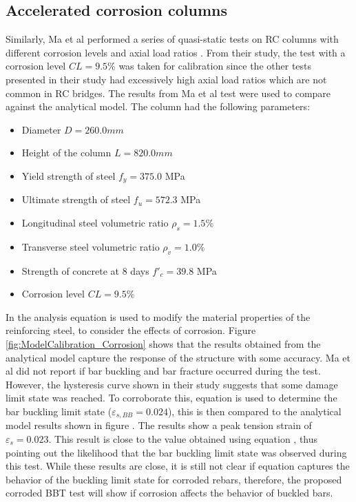 \subsection{Accelerated corrosion columns}
Similarly, Ma et al performed a series of quasi-static tests on RC columns with different corrosion levels and axial load ratios \cite{Ma2012}. From their study, the test with a corrosion level $CL=9.5\%$ was taken for calibration since the other tests presented in their study had excessively high axial load ratios which are not common in RC bridges. The results from Ma et al test	\cite{Ma2012} were used to compare against the analytical model. The column had the following parameters:
\begin{itemize}
	\item Diameter $D = 260.0 mm$
	\item Height of the column $L = 820.0 mm$
	\item Yield strength of steel $f_{y} = 375.0$ MPa
	\item Ultimate strength of steel $f_{u} = 572.3$ MPa
	\item Longitudinal steel volumetric ratio $\rho_{s} = 1.5\% $
	\item Transverse steel volumetric ratio $\rho_{v} = 1.0\% $
	\item Strength of concrete at 8 days $f'_{c} = 39.8$ MPa
	\item Corrosion level $CL=9.5\%$
\end{itemize}

In the analysis equation  is used to modify the material properties of the reinforcing steel, to consider the effects of corrosion. Figure \ref{fig:ModelCalibration_Corrosion} shows that the results obtained from the analytical model capture the response of the structure with some accuracy. Ma et al \cite{Ma2012} did not report if bar buckling and bar fracture occurred during the test. However, the hysteresis curve shown in their study suggests that some damage limit state was reached. To corroborate this, equation  is used to determine the bar buckling limit state ($\varepsilon_{s,BB}=0.024$), this is then compared to the analytical model results shown in figure . The results show a peak tension strain of $\varepsilon_{s}=0.023$. This result is close to the value obtained using equation , thus pointing out the likelihood that the bar buckling limit state was observed during this test. While these results are close, it is still not clear if equation  captures the behavior of the buckling limit state for corroded rebars, therefore, the proposed corroded BBT test will show if corrosion affects the behavior of buckled bars.

